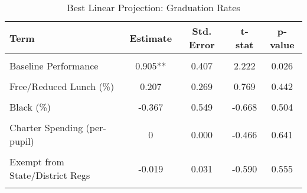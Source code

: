 \begin{table}[!h]
\centering
\caption{\label{tab:blp_afgr}Best Linear Projection: Graduation Rates}
\centering
\begin{tabular}[t]{lcccc}
\toprule
Term & Estimate & Std. Error & t-stat & p-value\\
\midrule
\cellcolor{gray!10}{(Intercept)} & \cellcolor{gray!10}{-2.085**} & \cellcolor{gray!10}{0.901} & \cellcolor{gray!10}{-2.314} & \cellcolor{gray!10}{0.021}\\
Baseline Performance & 0.905** & 0.407 & 2.222 & 0.026\\
\cellcolor{gray!10}{White (\%)} & \cellcolor{gray!10}{-0.002} & \cellcolor{gray!10}{0.300} & \cellcolor{gray!10}{-0.007} & \cellcolor{gray!10}{0.995}\\
Free/Reduced Lunch (\%) & 0.207 & 0.269 & 0.769 & 0.442\\
\cellcolor{gray!10}{TPS-Charter Spending (\% diff)} & \cellcolor{gray!10}{-0.065} & \cellcolor{gray!10}{0.294} & \cellcolor{gray!10}{-0.220} & \cellcolor{gray!10}{0.826}\\
Black (\%) & -0.367 & 0.549 & -0.668 & 0.504\\
\cellcolor{gray!10}{Special Ed (\%)} & \cellcolor{gray!10}{2.992**} & \cellcolor{gray!10}{1.445} & \cellcolor{gray!10}{2.070} & \cellcolor{gray!10}{0.038}\\
Charter Spending (per-pupil) & 0 & 0.000 & -0.466 & 0.641\\
\cellcolor{gray!10}{Log of Enrollment} & \cellcolor{gray!10}{0.132**} & \cellcolor{gray!10}{0.066} & \cellcolor{gray!10}{1.979} & \cellcolor{gray!10}{0.048}\\
Exempt from State/District Regs & -0.019 & 0.031 & -0.590 & 0.555\\
\cellcolor{gray!10}{Hispanic (\%)} & \cellcolor{gray!10}{0.352} & \cellcolor{gray!10}{0.369} & \cellcolor{gray!10}{0.956} & \cellcolor{gray!10}{0.339}\\
\bottomrule
\end{tabular}
\end{table}
